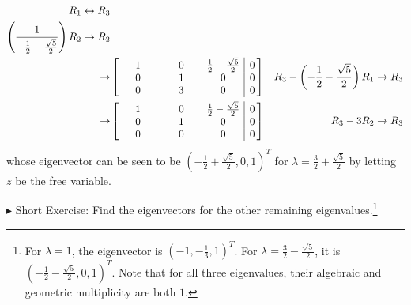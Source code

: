 \begin{solution}
\begin{align*}
\begin{aligned}
R_1 &\leftrightarrow R_3 \\
\left(\frac{1}{-\frac{1}{2}-\frac{\sqrt{5}}{2}}\right)R_2 &\to R_2
\end{aligned} \\
\to&
\left[\begin{array}{@{\,}wc{33pt}wc{30pt}wc{30pt}|c@{\,}}
1 & 0 & \frac{1}{2}-\frac{\sqrt{5}}{2} & 0 \\
0 & 1 & 0 & 0 \\
0 & 3 & 0 & 0
\end{array}\right] & R_3 - \left(-\frac{1}{2}-\frac{\sqrt{5}}{2}\right)R_1 \to R_3 \\
\to&
\left[\begin{array}{@{\,}wc{33pt}wc{30pt}wc{30pt}|c@{\,}}
1 & 0 & \frac{1}{2}-\frac{\sqrt{5}}{2} & 0 \\
0 & 1 & 0 & 0 \\
0 & 0 & 0 & 0
\end{array}\right] & R_3 - 3R_2 \to R_3
\end{align*}
whose eigenvector can be seen to be $(-\frac{1}{2}+\frac{\sqrt{5}}{2},0,1)^T$ for $\lambda = \frac{3}{2} + \frac{\sqrt{5}}{2}$ by letting $z$ be the free variable.
\end{solution}
$\blacktriangleright$ Short Exercise: Find the eigenvectors for the other remaining eigenvalues.\footnote{For $\lambda = 1$, the eigenvector is $(-1,-\frac{1}{3},1)^T$. For $\lambda = \frac{3}{2} - \frac{\sqrt{5}}{2}$, it is $(-\frac{1}{2}-\frac{\sqrt{5}}{2},0,1)^T$. Note that for all three eigenvalues, their algebraic and geometric multiplicity are both $1$.}

